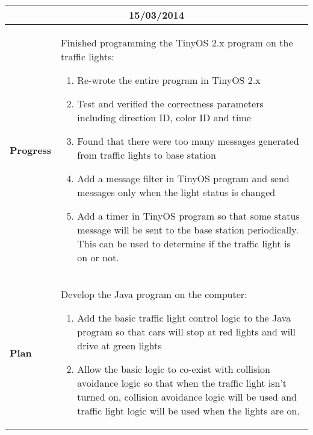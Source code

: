 \begin{center}
\begin{longtable}{ | p{2cm} | p{10cm} | }
                \multicolumn{2}{|c|}{\textbf{15/03/2014}} \\ \hline
                \textbf{Progress} & Finished programming the TinyOS 2.x program on the traffic lights:
                \begin{enumerate}
                  \item Re-wrote the entire program in TinyOS 2.x
                  \item Test and verified the correctness parameters including direction ID, color ID and time
                  \item Found that there were too many messages generated from traffic lights to base station
                  \item Add a message filter in TinyOS program and send messages only when the light status is changed
                  \item Add a timer in TinyOS program so that some status message will be sent to the base station periodically. This can be used to determine if the traffic light is on or not.
                \end{enumerate}  \\ \hline
                \textbf{Plan} & Develop the Java program on the computer:
                \begin{enumerate}
                  \item Add the basic traffic light control logic to the Java program so that cars will stop at red lights and will drive at green lights
                  \item Allow the basic logic to co-exist with collision avoidance logic so that when the traffic light isn't turned on, collision avoidance logic will be used and traffic light logic will be used when the lights are on.
                \end{enumerate}  \\ \hline


\end{longtable}
\end{center}
